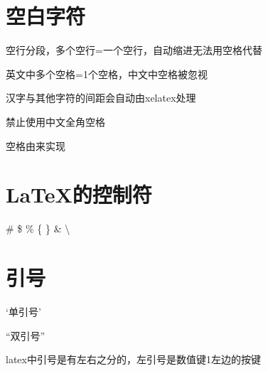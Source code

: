 \documentclass{article} %
\begin{document}
	\section{空白字符}
	空行分段，多个空行=一个空行，自动缩进无法用空格代替
	
	英文中多个空格=1个空格，中文中空格被忽视
	
	汉字与其他字符的间距会自动由xelatex处理
	
	禁止使用中文全角空格
	
	空格由\quad 来实现
	
	\section{\LaTeX 的控制符}
	\# \$ \% \{ \} \& \textbackslash
	
	\section{引号}
	`单引号'
	
	``双引号''
	
	latex中引号是有左右之分的，左引号是数值键1左边的按键
	
	
	
\end{document}
